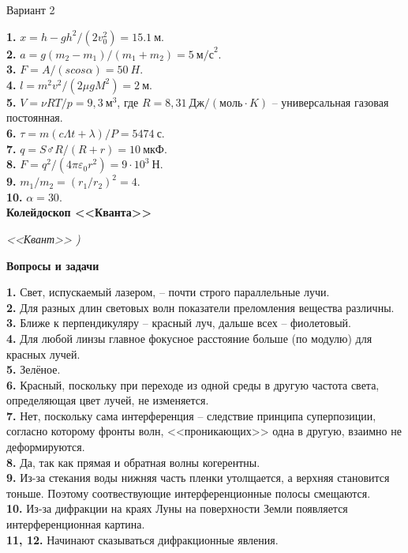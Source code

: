 \clearpage
\begin{multicols*}{2}
	
	\setcounter{page}{79}
	
	\noindent Вариант 2
	
	\noindent \textbf{1.} $x=h-gh^2/(2v_0^2)=15.1~{м}$.\\
	\textbf{2.} $a=g(m_2-m_1)/(m_1+m_2)=5~{м/с}^2$.\\
	\textbf{3.} $F=A/(s cos \alpha)=50~{H}$.\\
	\textbf{4.} $l=m^2v^2/(2\mu gM^2)=2~{м}$.\\
	\textbf{5.} $V=\nu RT/p=9,3~\text{м}^3$, где $R=8,31~{Дж/(моль\cdot K)}$ -- универсальная газовая постоянная. \\
	\textbf{6.} $\tau = m(c\Lambda t + \lambda)/P=5474~{с}$.\\
	\textbf{7.} $q = S\male R/(R+r)=10~мкФ$.\\
	\textbf{8.} $F = q^2/(4\pi \varepsilon _0r^2)=9\cdot 10^3~Н$.\\
	\textbf{9.} $m_1/m_2=(r_1/r_2)^2=4$.\\
	\textbf{10.} $\alpha = 30$\textdegree. \vspace{0.6cm}\\
	
	\noindent \textbf{Колейдоскоп <<Кванта>>}
	
	\textit{<<Квант>> )}\vspace{3mm}
	
	\noindent \textbf{Вопросы и задачи} 
	\begin{spacing}{0.9}
		\noindent \textbf{1.} Свет, испускаемый лазером, -- почти строго параллельные лучи. \\
		\textbf{2.} Для разных длин световых волн показатели преломления вещества различны. \\
		\textbf{3.} Ближе к перпендикуляру -- красный луч, дальше всех -- фиолетовый. \\
		\textbf{4.} Для любой линзы главное фокусное расстояние больше (по модулю) для красных лучей. \\
		\textbf{5.} Зелёное. \\
		\textbf{6.} Красный, поскольку при переходе из одной среды в другую частота света, определяющая цвет лучей, не изменяется. \\
		\textbf{7.} Нет, поскольку сама интерференция -- следствие принципа суперпозиции, согласно которому фронты волн, <<проникающих>> одна в другую, взаимно не деформируются. \\
		\textbf{8.} Да, так как прямая и обратная волны когерентны. \\
		\textbf{9.} Из-за стекания воды нижняя часть пленки утолщается, а верхняя становится тоньше. Поэтому соотвествующие интерференционные полосы смещаются.\\
		\textbf{10.} Из-за дифракции на краях Луны на поверхности Земли появляется интерференционная картина. \\
		\textbf{11, 12.} Начинают сказываться дифракционные явления.\vspace{2mm}
	\end{spacing}
		

\end{multicols*}
